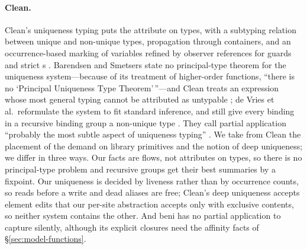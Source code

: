 \paragraph{Clean.} Clean's uniqueness typing puts the attribute \code{*} on types, with a subtyping
relation between unique and non-unique types, propagation through containers, and an occurrence-based
marking of variables refined by observer references for guards and strict s
\citep{smetsers1994guaranteeing,barendsen1993conventional,barendsen1996uniqueness,plasmeijer2011clean}.
Barendsen and Smetsers state no principal-type theorem for the uniqueness system---because of its
treatment of higher-order functions, ``there is no `Principal Uniqueness Type Theorem'\,''---and Clean
treats an expression whose most general typing cannot be attributed as untypable
\citep[\S8]{barendsen1996uniqueness}; de Vries et al.\ reformulate the system to fit standard inference,
and still give every binding in a recursive binding group a non-unique type
\citep{devries2007redefined,devries2008simplified}. They call partial
application ``probably the most subtle aspect of uniqueness typing'' \citep[\S4.2]{devries2008simplified}.
We take from Clean the placement of the demand on library primitives and the notion of deep uniqueness;
we differ in three ways. Our facts are flows, not attributes on types, so there is no principal-type
problem and recursive groups get their best summaries by a fixpoint. Our uniqueness is decided by
liveness rather than by occurrence counts, so reads before a write and dead aliases are free; Clean's
deep uniqueness accepts element edits that our per-site abstraction accepts only with exclusive contents,
so neither system contains the other. And beni has no partial application to capture silently, although
its explicit closures need the affinity facts of \S\ref{sec:model-functions}.

